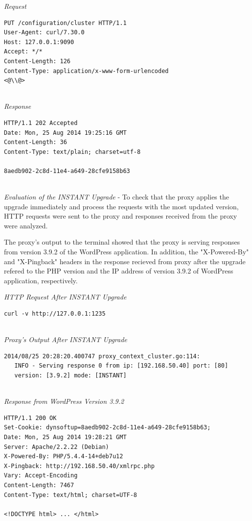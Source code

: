 \documentclass[a4paper,11pt,twoside]{report}
\begin{document}
\noindent
\textit{Request}
\begin{lstlisting}[language=terminal]
PUT /configuration/cluster HTTP/1.1
User-Agent: curl/7.30.0
Host: 127.0.0.1:9090
Accept: */*
Content-Length: 126
Content-Type: application/x-www-form-urlencoded
<@\\@>
\end{lstlisting}

\noindent\\
\textit{Response}
\begin{lstlisting}[language=terminal]
HTTP/1.1 202 Accepted
Date: Mon, 25 Aug 2014 19:25:16 GMT
Content-Length: 36
Content-Type: text/plain; charset=utf-8

8aedb902-2c8d-11e4-a649-28cfe9158b63
\end{lstlisting}  

\noindent\\
\textit{Evaluation of the INSTANT Upgrade} - To check that the proxy applies the upgrade immediately and process the requests with the most updated version, HTTP requests were sent to the proxy and responses received from the proxy were analyzed.

The proxy's output to the terminal showed that the proxy is serving responses from version 3.9.2 of the WordPress application. In addition, the "X-Powered-By" and "X-Pingback" headers in the response recieved from proxy after the upgrade refered to the PHP version and the IP address of version 3.9.2 of WordPress application, respectively. \smallskip 

\noindent
\textit{HTTP Request After INSTANT Upgrade}
\begin{lstlisting}[language=terminal]
curl -v http://127.0.0.1:1235
\end{lstlisting}

\noindent\\
\textit{Proxy's Output After INSTANT Upgrade}
\begin{lstlisting}[language=terminal]
2014/08/25 20:28:20.400747 proxy_context_cluster.go:114:     
   INFO - Serving response 0 from ip: [192.168.50.40] port: [80] 
   version: [3.9.2] mode: [INSTANT]
\end{lstlisting}

\noindent\\
\textit{Response from WordPress Version 3.9.2 }
\begin{lstlisting}[language=terminal]
HTTP/1.1 200 OK
Set-Cookie: dynsoftup=8aedb902-2c8d-11e4-a649-28cfe9158b63;
Date: Mon, 25 Aug 2014 19:28:21 GMT
Server: Apache/2.2.22 (Debian)
X-Powered-By: PHP/5.4.4-14+deb7u12
X-Pingback: http://192.168.50.40/xmlrpc.php
Vary: Accept-Encoding
Content-Length: 7467
Content-Type: text/html; charset=UTF-8

<!DOCTYPE html> ... </html>
\end{lstlisting}
\end{document}
